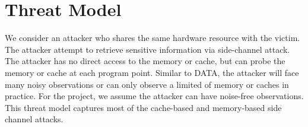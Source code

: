\section{Threat Model}
We consider an attacker who shares the same hardware resource with the victim. 
The attacker attempt to retrieve sensitive information via side-channel attack. 
The attacker has no direct access to the memory or cache, but can probe the memory 
or cache at each program point. Similar to DATA, the attacker will face many 
noisy observations or can only observe a limited of memory or caches in practice. 
For the project, we assume the attacker can have noise-free observations. 
This threat model captures most of the cache-based and memory-based side channel attacks.
